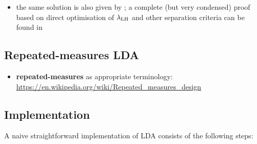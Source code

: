 \documentclass[a4paper]{article}
\begin{document}
\begin{itemize}
   \footnote{The coordinate transformation $\mathbf{S}$ ensures that average within-group variance is a unit sphere ($\mathbf{W}' = \mathbf{I}$). Since $\mathbf{A}'$ is chosen to be an orthogonal projection, it preserves the spherical property but reduces variance to the proportion captured by the discriminant space.}
 \item the same solution is also given by \citet[192]{Bishop:06}; a complete (but very condensed) proof based on direct optimisation of $\lambda_{\text{LH}}$ and other separation criteria can be found in \citep[446--452]{Fukunaga:90}
\end{itemize}

\subsection{Repeated-measures LDA}
\label{sec:lda:repeated}

\begin{itemize}
\item \textbf{repeated-measures} as appropriate terminology: \url{https://en.wikipedia.org/wiki/Repeated_measures_design}
\end{itemize}

\subsection{Implementation}
\label{sec:lda:implement}

A naive straightforward implementation of LDA consists of the following steps:
\end{document}
